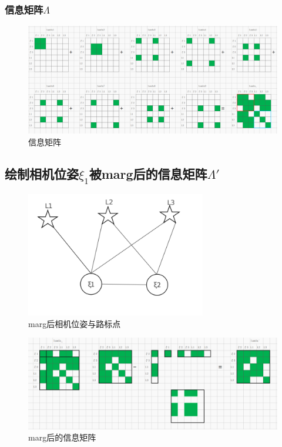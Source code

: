 \documentclass[UTF8]{ctexart}
\begin{document}
\subsubsection{信息矩阵$\Lambda$}
\begin{figure}[H]
\centering
\includegraphics[width=1.1\textwidth]{1.1.png}    
\caption{信息矩阵}
\label{img1}
\end{figure}

\subsection{绘制相机位姿$\xi _1$被marg后的信息矩阵$\Lambda '$}
\begin{figure}[H]
\centering
\includegraphics[width=0.7\textwidth]{1_2.png}    
\caption{marg后相机位姿与路标点}
\label{img1}
\end{figure}

\begin{figure}[H]
\centering
\includegraphics[width=1.1\textwidth]{1.2.png}    
\caption{marg后的信息矩阵}
\label{img1}
\end{figure}
\end{document}
